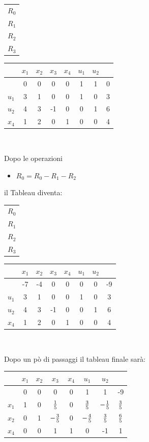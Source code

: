 \documentclass[12pt,a4paper]{article}
\begin{document}
\begin{center}
\begin{tabular}{c}
\\
$R_0$\\
$R_1$\\
$R_2$\\
$R_3$\\
\end{tabular}
\begin{tabular}{r|cccccc|c|}
& $x_1$ & $x_2$ & $x_3$ & $x_4$ & $u_1$ & $u_2$ \\
 \hline
& 0 & 0 & 0 & 0 & 1 & 1 & 0\\
$u_1$ & 3 & 1 & 0 & 0 & 1 & 0 & 3\\
$u_2$ & 4 & 3 & -1 & 0 & 0 & 1 & 6\\
$x_4$ & 1 & 2 & 0 & 1 & 0 & 0 & 4\\
\end{tabular}\\
\end{center}
Dopo le operazioni \begin{itemize}
\item $R_0 = R_0-R_1-R_2$
\end{itemize} il Tableau diventa:
\begin{center}
\begin{tabular}{c}
\\
$R_0$\\
$R_1$\\
$R_2$\\
$R_3$\\
\end{tabular}
\begin{tabular}{r|cccccc|c|}
& $x_1$ & $x_2$ & $x_3$ & $x_4$ & $u_1$ & $u_2$ \\
 \hline
& -7 & -4 & 0 & 0 & 0 & 0 & -9\\
$u_1$ & 3 & 1 & 0 & 0 & 1 & 0 & 3\\
$u_2$ & 4 & 3 & -1 & 0 & 0 & 1 & 6\\
$x_4$ & 1 & 2 & 0 & 1 & 0 & 0 & 4\\
\end{tabular}\\
\end{center}
Dopo un pò di passaggi il tableau finale sarà:
\begin{center}
\begin{tabular}{r|cccccc|c|}
& $x_1$ & $x_2$ & $x_3$ & $x_4$ & $u_1$ & $u_2$ \\
 \hline
& 0 & 0 & 0 & 0 & 1 & 1 & -9\\
$x_1$ & 1 & 0 & $1\over5$ & 0 & $3\over 5$ & $-{1\over5}$ & $3\over5$\\
$x_2$ & 0 & 1 & $-{3\over5}$ & 0 & $-{4\over5}$ & $3\over5$ & $6\over5$\\
$x_4$ & 0 & 0 & 1 & 1 & 0 & -1 & 1\\
\end{tabular}\\
\end{center}
\end{document}

